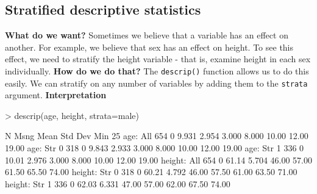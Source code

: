\documentclass[landscape]{article}
\renewenvironment{Schunk}{\vspace{\topsep}}{\vspace{\topsep}}
\begin{document}
\subsection{Stratified descriptive statistics}
{\large \textbf{What do we want?}}\newline
Sometimes we believe that a variable has an effect on another. For example, we believe that sex has an effect on height. To see this effect, we need to stratify the height variable - that is, examine height in each sex individually. \newline
{\large \textbf{How do we do that?}}\newline
The \texttt{descrip()} function allows us to do this easily. We can stratify on any number of variables by adding them to the \texttt{strata} argument.\newline
{\large \textbf{Interpretation}}\newline
\begin{Schunk}
\begin{Sinput}
> descrip(age, height, strata=male)
\end{Sinput}
\begin{Soutput}
                  N     Msng  Mean      Std Dev    Min       25%
   age:  All        654     0   9.931     2.954     3.000     8.000     10.00     12.00     19.00  
   age:    Str  0   318     0   9.843     2.933     3.000     8.000     10.00     12.00     19.00  
   age:    Str  1   336     0   10.01     2.976     3.000     8.000     10.00     12.00     19.00  
height:  All        654     0   61.14     5.704     46.00     57.00     61.50     65.50     74.00  
height:    Str  0   318     0   60.21     4.792     46.00     57.50     61.00     63.50     71.00  
height:    Str  1   336     0   62.03     6.331     47.00     57.00     62.00     67.50     74.00  
\end{Soutput}
\end{Schunk}
\clearpage
\end{document}
